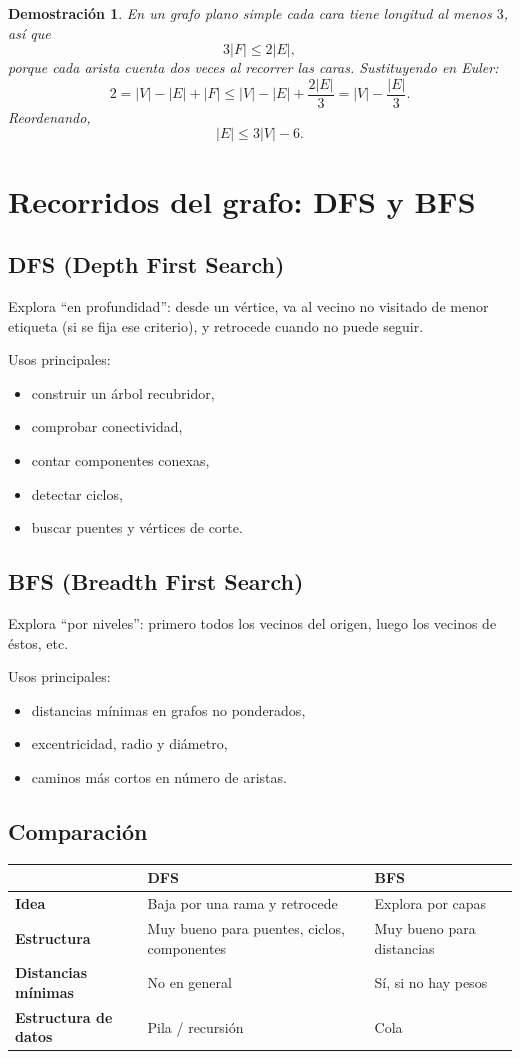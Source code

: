 \documentclass[11pt,a4paper]{article}
\newtheorem*{dem}{Demostración}
\begin{document}
\begin{dem}
En un grafo plano simple cada cara tiene longitud al menos $3$, así que
\[
3|F|\le 2|E|,
\]
porque cada arista cuenta dos veces al recorrer las caras. Sustituyendo en Euler:
\[
2=|V|-|E|+|F|\le |V|-|E|+\frac{2|E|}{3}=|V|-\frac{|E|}{3}.
\]
Reordenando,
\[
|E|\le 3|V|-6.
\]
\end{dem}

\section{Recorridos del grafo: DFS y BFS}

\subsection{DFS (Depth First Search)}
Explora ``en profundidad'': desde un vértice, va al vecino no visitado de menor etiqueta (si se fija ese criterio), y retrocede cuando no puede seguir.

Usos principales:
\begin{itemize}
    \item construir un árbol recubridor,
    \item comprobar conectividad,
    \item contar componentes conexas,
    \item detectar ciclos,
    \item buscar puentes y vértices de corte.
\end{itemize}

\subsection{BFS (Breadth First Search)}
Explora ``por niveles'': primero todos los vecinos del origen, luego los vecinos de éstos, etc.

Usos principales:
\begin{itemize}
    \item distancias mínimas en grafos no ponderados,
    \item excentricidad, radio y diámetro,
    \item caminos más cortos en número de aristas.
\end{itemize}

\subsection{Comparación}
\begin{center}
\begin{tabular}{>{\bfseries}p{3cm}p{5.3cm}p{5.3cm}}
\toprule
 & DFS & BFS\\
\midrule
Idea & Baja por una rama y retrocede & Explora por capas\\
Estructura & Muy bueno para puentes, ciclos, componentes & Muy bueno para distancias\\
Distancias mínimas & No en general & Sí, si no hay pesos\\
Estructura de datos & Pila / recursión & Cola\\
\bottomrule
\end{tabular}
\end{center}
\end{document}
